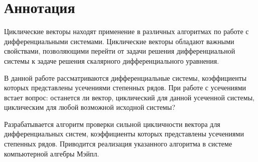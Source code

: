 \section*{Аннотация}

Циклические векторы находят применение в различных алгоритмах по работе с дифференциальными системами.
Циклические векторы обладают важными свойствами, позволяющими перейти от задачи решения дифференциальной системы
к задаче решения скалярного дифференциального уравнения.

В данной работе рассматриваются дифференциальные системы, коэффициенты которых представлены усечениями степенных рядов.
При работе с усечениями встает вопрос: останется ли вектор, циклический для данной усеченной системы, циклическим для любой возможной исходной системы?

Разрабатывается алгоритм проверки сильной цикличности вектора для дифференциальных систем, коэффициенты которых представлены усечениями степенных рядов.
Приводится реализация указанного алгоритма в системе компьютерной алгебры Мэйпл.